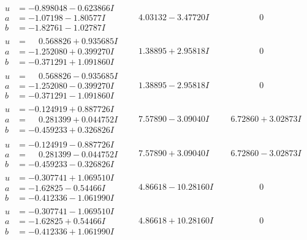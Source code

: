 \documentclass[1p]{elsarticle_modified}
\theoremstyle{definition}
\begin{document}
$$\begin{array}{c|c|c}
\begin{aligned}
u &= -0.898048 - 0.623866 I \\
a &= -1.07198 - 1.80577 I \\
b &= -1.82761 - 1.02787 I\end{aligned}
 & \phantom{-}4.03132 - 3.47720 I & \phantom{-0.000000 } 0 \\ \hline\begin{aligned}
u &= \phantom{-}0.568826 + 0.935685 I \\
a &= -1.252080 + 0.399270 I \\
b &= -0.371291 + 1.091860 I\end{aligned}
 & \phantom{-}1.38895 + 2.95818 I & \phantom{-0.000000 } 0 \\ \hline\begin{aligned}
u &= \phantom{-}0.568826 - 0.935685 I \\
a &= -1.252080 - 0.399270 I \\
b &= -0.371291 - 1.091860 I\end{aligned}
 & \phantom{-}1.38895 - 2.95818 I & \phantom{-0.000000 } 0 \\ \hline\begin{aligned}
u &= -0.124919 + 0.887726 I \\
a &= \phantom{-}0.281399 + 0.044752 I \\
b &= -0.459233 + 0.326826 I\end{aligned}
 & \phantom{-}7.57890 - 3.09040 I & \phantom{-}6.72860 + 3.02873 I \\ \hline\begin{aligned}
u &= -0.124919 - 0.887726 I \\
a &= \phantom{-}0.281399 - 0.044752 I \\
b &= -0.459233 - 0.326826 I\end{aligned}
 & \phantom{-}7.57890 + 3.09040 I & \phantom{-}6.72860 - 3.02873 I \\ \hline\begin{aligned}
u &= -0.307741 + 1.069510 I \\
a &= -1.62825 - 0.54466 I \\
b &= -0.412336 - 1.061990 I\end{aligned}
 & \phantom{-}4.86618 - 10.28160 I & \phantom{-0.000000 } 0 \\ \hline\begin{aligned}
u &= -0.307741 - 1.069510 I \\
a &= -1.62825 + 0.54466 I \\
b &= -0.412336 + 1.061990 I\end{aligned}
 & \phantom{-}4.86618 + 10.28160 I & \phantom{-0.000000 } 0 \\ \hline\begin{aligned}

\end{aligned}
\end{array}$$
\end{document}

